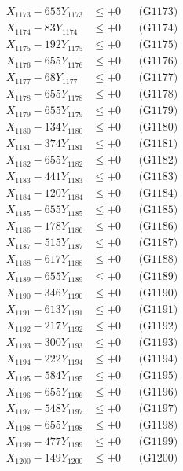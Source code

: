 \documentclass[a4paper,10pt]{article}
\begin{document}
{\begin{align}
X_{1173} - 655Y_{1173} &\leq +0 && \text{(G1173)} \\
X_{1174} - 83Y_{1174} &\leq +0 && \text{(G1174)} \\
X_{1175} - 192Y_{1175} &\leq +0 && \text{(G1175)} \\
X_{1176} - 655Y_{1176} &\leq +0 && \text{(G1176)} \\
X_{1177} - 68Y_{1177} &\leq +0 && \text{(G1177)} \\
X_{1178} - 655Y_{1178} &\leq +0 && \text{(G1178)} \\
X_{1179} - 655Y_{1179} &\leq +0 && \text{(G1179)} \\
X_{1180} - 134Y_{1180} &\leq +0 && \text{(G1180)} \\
\allowbreak
X_{1181} - 374Y_{1181} &\leq +0 && \text{(G1181)} \\
X_{1182} - 655Y_{1182} &\leq +0 && \text{(G1182)} \\
X_{1183} - 441Y_{1183} &\leq +0 && \text{(G1183)} \\
X_{1184} - 120Y_{1184} &\leq +0 && \text{(G1184)} \\
X_{1185} - 655Y_{1185} &\leq +0 && \text{(G1185)} \\
X_{1186} - 178Y_{1186} &\leq +0 && \text{(G1186)} \\
X_{1187} - 515Y_{1187} &\leq +0 && \text{(G1187)} \\
X_{1188} - 617Y_{1188} &\leq +0 && \text{(G1188)} \\
X_{1189} - 655Y_{1189} &\leq +0 && \text{(G1189)} \\
X_{1190} - 346Y_{1190} &\leq +0 && \text{(G1190)} \\
\allowbreak
X_{1191} - 613Y_{1191} &\leq +0 && \text{(G1191)} \\
X_{1192} - 217Y_{1192} &\leq +0 && \text{(G1192)} \\
X_{1193} - 300Y_{1193} &\leq +0 && \text{(G1193)} \\
X_{1194} - 222Y_{1194} &\leq +0 && \text{(G1194)} \\
X_{1195} - 584Y_{1195} &\leq +0 && \text{(G1195)} \\
X_{1196} - 655Y_{1196} &\leq +0 && \text{(G1196)} \\
X_{1197} - 548Y_{1197} &\leq +0 && \text{(G1197)} \\
X_{1198} - 655Y_{1198} &\leq +0 && \text{(G1198)} \\
X_{1199} - 477Y_{1199} &\leq +0 && \text{(G1199)} \\
X_{1200} - 149Y_{1200} &\leq +0 && \text{(G1200)} \\

\end{align}}
\end{document}
